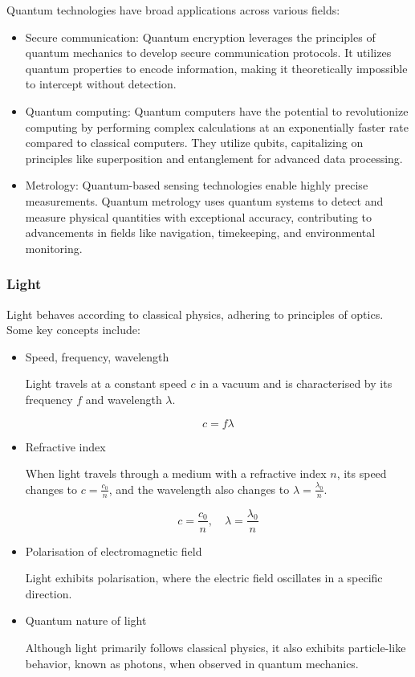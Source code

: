 \documentclass[12pt,a4paper]{article}
\begin{document}
Quantum technologies have broad applications across various fields:
\begin{itemize}
\item Secure communication: Quantum encryption leverages the principles of quantum mechanics to develop secure communication protocols. It utilizes quantum properties to encode information, making it theoretically impossible to intercept without detection.

\item Quantum computing: Quantum computers have the potential to revolutionize computing by performing complex calculations at an exponentially faster rate compared to classical computers. They utilize qubits, capitalizing on principles like superposition and entanglement for advanced data processing.

\item Metrology: Quantum-based sensing technologies enable highly precise measurements. Quantum metrology uses quantum systems to detect and measure physical quantities with exceptional accuracy, contributing to advancements in fields like navigation, timekeeping, and environmental monitoring.
\end{itemize}

\subsubsection{Light}
Light behaves according to classical physics, adhering to principles of optics. Some key concepts include:
\begin{itemize}
\item Speed, frequency, wavelength

Light travels at a constant speed $c$ in a vacuum and is characterised by its frequency $f$ and wavelength $\lambda$.

\begin{equation}
c=f\lambda
\end{equation}

\item Refractive index

When light travels through a medium with a refractive index $n$, its speed changes to $c = \frac{c_0}{n}$, and the wavelength also changes to $\lambda = \frac{\lambda_0}{n}$.

\begin{equation}
c=\frac{c_0}{n}, \quad \lambda=\frac{\lambda_0}{n}
\end{equation}

\item Polarisation of electromagnetic field

Light exhibits polarisation, where the electric field oscillates in a specific direction.

\item Quantum nature of light

Although light primarily follows classical physics, it also exhibits particle-like behavior, known as photons, when observed in quantum mechanics.
\end{itemize}
\end{document}

